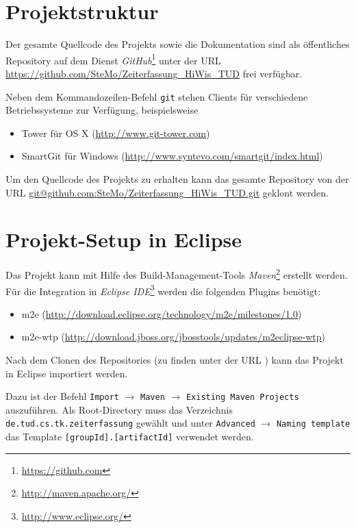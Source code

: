 \documentclass[article,colorback,accentcolor=tud2c]{tudreport}
\begin{document}
\section{Projektstruktur} %
\label{sec:projektstruktur}

Der gesamte Quellcode des Projekts sowie die Dokumentation sind als öffentliches Repository auf dem Dienst \emph{GitHub}\footnote{\url{https://github.com}} unter der URL \url{https://github.com/SteMo/Zeiterfassung_HiWis_TUD} frei verfügbar.

Neben dem Kommandozeilen-Befehl \texttt{git} stehen Clients für verschiedene Betriebssysteme zur Verfügung, beispielsweise

\begin{itemize}
    \item Tower für OS X (\url{http://www.git-tower.com})
    \item SmartGit für Windows (\url{http://www.syntevo.com/smartgit/index.html})
\end{itemize}

Um den Quellcode des Projekts zu erhalten kann das gesamte Repository von der URL \url{git@github.com:SteMo/Zeiterfassung_HiWis_TUD.git} geklont werden.


\section{Projekt-Setup in Eclipse} %
\label{sec:projekt_setup_in_eclipse}

Das Projekt kann mit Hilfe des Build-Management-Tools \emph{Maven}\footnote{\url{http://maven.apache.org/}} erstellt werden. Für die Integration in \emph{Eclipse IDE}\footnote{\url{http://www.eclipse.org/}} werden die folgenden Plugins benötigt:

\begin{itemize}
    \item m2e (\url{http://download.eclipse.org/technology/m2e/milestones/1.0})
    \item m2e-wtp (\url{http://download.jboss.org/jbosstools/updates/m2eclipse-wtp})
\end{itemize}

Nach dem Clonen des Repositories (zu finden unter der URL ) kann das Projekt in Eclipse importiert werden.

Dazu ist der Befehl \texttt{Import} $\rightarrow$ \texttt{Maven} $\rightarrow$ \texttt{Existing Maven Projects} auszuführen. Als Root-Directory muss das Verzeichnis \texttt{de.tud.cs.tk.zeiterfassung} gewählt und unter \texttt{Advanced} $\rightarrow$ \texttt{Naming template} das Template \texttt{[groupId].[artifactId]} verwendet werden.
\end{document}

